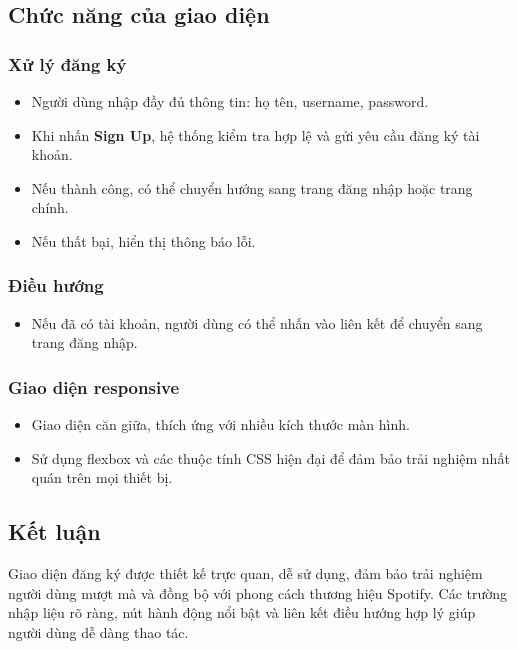 \documentclass{book}
\begin{document}
\subsection{Chức năng của giao diện}

\subsubsection{Xử lý đăng ký}
\begin{itemize}
    \item Người dùng nhập đầy đủ thông tin: họ tên, username, password.
    \item Khi nhấn \textbf{Sign Up}, hệ thống kiểm tra hợp lệ và gửi yêu cầu đăng ký tài khoản.
    \item Nếu thành công, có thể chuyển hướng sang trang đăng nhập hoặc trang chính.
    \item Nếu thất bại, hiển thị thông báo lỗi.
\end{itemize}

\subsubsection{Điều hướng}
\begin{itemize}
    \item Nếu đã có tài khoản, người dùng có thể nhấn vào liên kết để chuyển sang trang đăng nhập.
\end{itemize}

\subsubsection{Giao diện responsive}
\begin{itemize}
    \item Giao diện căn giữa, thích ứng với nhiều kích thước màn hình.
    \item Sử dụng flexbox và các thuộc tính CSS hiện đại để đảm bảo trải nghiệm nhất quán trên mọi thiết bị.
\end{itemize}

\subsection{Kết luận}
Giao diện đăng ký được thiết kế trực quan, dễ sử dụng, đảm bảo trải nghiệm người dùng mượt mà và đồng bộ với phong cách thương hiệu Spotify. Các trường nhập liệu rõ ràng, nút hành động nổi bật và liên kết điều hướng hợp lý giúp người dùng dễ dàng thao tác.
\end{document}
